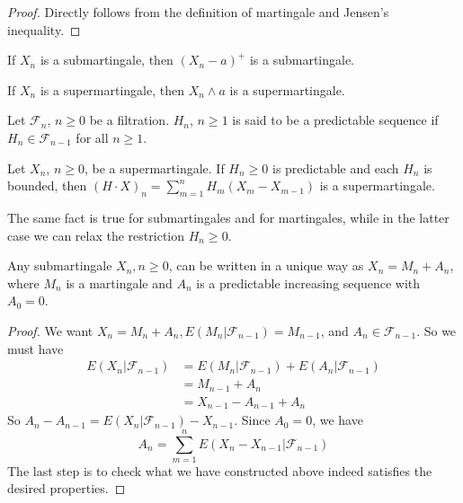 \begin{proof}
Directly follows from the definition of martingale and Jensen's inequality.
\end{proof}
\begin{corollary}
If $X_n$ is a submartingale, then $(X_n-a)^+$ is a submartingale.
\end{corollary}
\begin{corollary}
If $X_n$ is a supermartingale, then $X_n\wedge a$ is a supermartingale.
\end{corollary}
\begin{definition}[predictable]
Let $\mathcal{F}_n$, $n\ge 0$ be a filtration. $H_n$, $n\ge 1$ is said to be a predictable sequence if $H_n\in\mathcal{F}_{n-1}$ for all $n\ge 1$.
\end{definition}
\begin{example}

\end{example}
\begin{theorem}
Let $X_n$, $n\ge 0$, be a supermartingale. If $H_n\ge0$ is predictable and each $H_n$ is bounded, then $(H\cdot X)_n=\sum_{m=1}^nH_m(X_m-X_{m-1})$ is a supermartingale. \par
The same fact is true for submartingales and for martingales, while in the latter case we can relax the restriction $H_n\ge0$.
\end{theorem}


\begin{theorem}
Any submartingale $X_n,n\ge 0$, can be written in a unique way as $X_n=M_n+A_n$, where $M_n$ is a martingale and $A_n$ is a predictable increasing sequence with $A_0=0$.
\end{theorem}
\begin{proof}
We want $X_n=M_n+A_n,E(M_n|\mathcal{F}_{n-1})=M_{n-1}$, and $A_n\in\mathcal{F}_{n-1}$. So we must have 
\begin{align*}
E(X_n|\mathcal{F}_{n-1})&=E(M_n|\mathcal{F}_{n-1})+E(A_n|\mathcal{F}_{n-1})\\
&=M_{n-1}+A_n\\
&=X_{n-1}-A_{n-1}+A_n
\end{align*}
So $A_n-A_{n-1}=E(X_n|\mathcal{F}_{n-1})-X_{n-1}$. Since $A_0=0$, we have \[A_n=\sum_{m=1}^nE(X_n-X_{n-1}|\mathcal{F}_{n-1})\]
The last step is to check what we have constructed above indeed satisfies the desired properties.
\end{proof}

